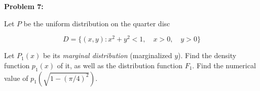 \textbf{Problem 7:}

\singlespacing

Let $P$ be the uniform distribution on the quarter disc

\begin{equation}
    D = \{(x, y): x^2 + y^2 < 1,\quad x > 0,\quad y > 0\}
\end{equation}

Let $P_1(x)$ be its \textit{marginal distribution} (marginalized $y$).
Find the density function $p_1(x)$ of it, as well as the
distribution function $F_1$. Find the numerical value of $p_1 (\sqrt{1 - (\pi/4)^2})$.